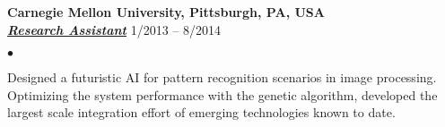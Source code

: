 \documentclass[11pt]{article}
\newcommand{\employer}[3]{{ \textbf{#1} \\ \underline{\textbf{\emph{#3}}} \hfill  #2\\  }}
\newenvironment{achievements}{\begin{list}{$\bullet$}{\topsep 0pt \itemsep -2pt}}{\vspace*{4pt}\end{list}}
\begin{document}
	
	
\employer{Carnegie Mellon University, Pittsburgh, PA, USA}{1/2013 -- 8/2014}{Research Assistant}

	\begin{achievements}


\item Designed a futuristic AI for pattern recognition scenarios in image processing. Optimizing the system performance with the genetic algorithm, developed the largest scale integration effort of emerging technologies  known to date.
    

\end{achievements}
\end{document}
